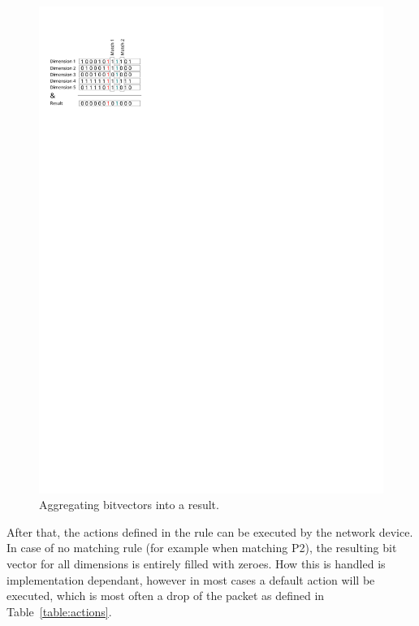 \documentclass[a4paper,
		12pt,
		parskip=full,
		titlepage
		]{scrartcl}
\begin{document}
\begin{figure}
\centering
\includegraphics[height=0.3\textheight]{images/matching}
\caption{Aggregating bitvectors into a result.}
\label{fig:bv-and}
\end{figure}

After that, the actions defined in the rule can be executed by the network device.
In case of no matching rule (for example when matching P2), the resulting bit vector for all dimensions is entirely filled with zeroes.
How this is handled is implementation dependant, however in most cases a 
default action will be executed, which is most often a drop of the packet as defined in Table~\ref{table:actions}.
\end{document}
